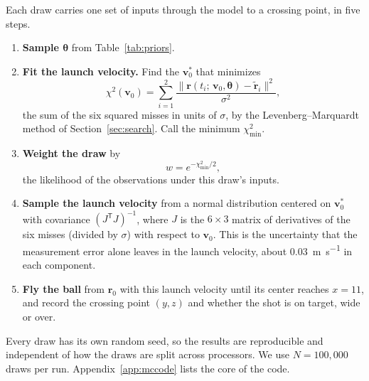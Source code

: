 \documentclass[10pt,a4paper]{article}
\begin{document}
Each draw carries one set of inputs through the model to a crossing point, in
five steps.
\begin{enumerate}
  \item \textbf{Sample $\bm{\theta}$} from Table~\ref{tab:priors}.
  \item \textbf{Fit the launch velocity.} Find the $\bm{v}_0^*$ that
    minimizes
    \begin{equation}
      \chi^2(\bm{v}_0) = \sum_{i=1}^{2}
        \frac{\big\|\bm{r}(t_i;\, \bm{v}_0, \bm{\theta}) - \tilde{\bm{r}}_i\big\|^2}{\sigma^2},
      \label{eq:chi2}
    \end{equation}
    the sum of the six squared misses in units of $\sigma$, by the
    Levenberg--Marquardt method of Section~\ref{sec:search}. Call the minimum
    $\chi^2_{\min}$.
  \item \textbf{Weight the draw} by
    \begin{equation}
      w = e^{-\chi^2_{\min}/2},
      \label{eq:weight}
    \end{equation}
    the likelihood of the observations under this draw's inputs.
  \item \textbf{Sample the launch velocity} from a normal distribution
    centered on $\bm{v}_0^*$ with covariance $(J^\mathsf{T}J)^{-1}$, where $J$
    is the $6 \times 3$ matrix of derivatives of the six misses (divided by
    $\sigma$) with respect to $\bm{v}_0$. This is the uncertainty that the
    measurement error alone leaves in the launch velocity, about
    \SI{0.03}{\metre\per\second} in each component.
  \item \textbf{Fly the ball} from $\bm{r}_0$ with this launch velocity until
    its center reaches $x = 11$, and record the crossing point $(y, z)$ and
    whether the shot is on target, wide or over.
\end{enumerate}
Every draw has its own random seed, so the results are reproducible and
independent of how the draws are split across processors. We use
$N = 100{,}000$ draws per run. Appendix~\ref{app:mccode} lists the core of
the code.
\end{document}
